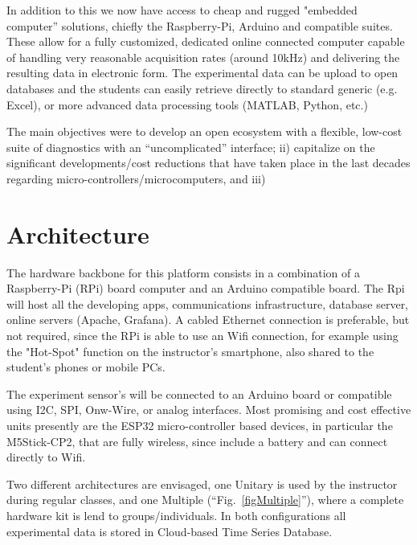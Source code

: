 \documentclass[conference]{IEEEtran}
\begin{document}
In addition to this we now have access to cheap and rugged "embedded computer” solutions, chiefly the Raspberry-Pi, Arduino and compatible suites.
These allow for a fully customized, dedicated online connected computer capable of handling very reasonable acquisition rates (around 10kHz) 
and delivering the resulting data in electronic form. 
The experimental data can be upload to open databases and the students can easily retrieve 
 directly to standard generic (e.g. Excel), or more advanced data processing tools
 (MATLAB, Python, etc.)

The main objectives were to develop an open ecosystem with a flexible, low-cost suite of diagnostics with an ``uncomplicated'' interface; ii) capitalize on the significant developments/cost reductions that have taken place in the last decades regarding micro-controllers/microcomputers, and iii)

\section{Architecture}
The hardware backbone for this platform consists in a combination of a Raspberry-Pi (RPi) board computer and an Arduino compatible board. 
The Rpi will host all the developing apps, communications infrastructure, database server, online servers (Apache, Grafana). 
 A cabled Ethernet connection is preferable, but not  required, since the RPi is able to use an Wifi connection, 
 for example using the "Hot-Spot" function on the instructor’s smartphone, also shared to the student’s phones or mobile PCs.

 The experiment sensor's will be connected to an Arduino board or compatible using I2C, SPI, Onw-Wire, or analog interfaces.
 Most promising and cost effective units presently are the ESP32 micro-controller based devices, in particular the M5Stick-CP2,
 that are fully wireless, since include a battery and can connect directly to Wifi.

 Two different architectures are envisaged, one Unitary is used by the instructor during regular classes, 
 and one Multiple (``Fig.~\ref{figMultiple}''),
 where a complete hardware kit is lend to groups/individuals. 
 In both configurations all experimental data is stored in Cloud-based Time Series Database\cite{b3}.
 
\end{document}
